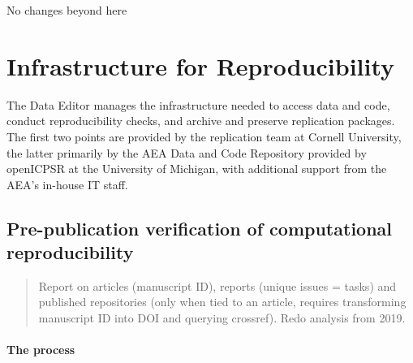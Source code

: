 \documentclass[PP]{AEA}
\newcommand{\aeadcr}{AEA Data and Code Repository}
\begin{document}
\begin{center}
    No changes beyond here
\end{center}

\section{Infrastructure for Reproducibility}
\label{sec:infrastructure}

The Data Editor manages the infrastructure needed to access data and code, conduct reproducibility checks, and archive and preserve replication packages. The first two points are provided by the replication team at Cornell University, the latter primarily by the  \aeadcr{} provided by openICPSR at the University of Michigan, with additional support from the AEA's in-house IT staff. 


\subsection{Pre-publication verification of computational reproducibility}
\label{sec:verification}


\begin{quote}
Report on articles (manuscript ID), reports (unique issues = tasks) and published repositories (only when tied to an article, requires transforming manuscript ID into DOI and querying crossref). Redo analysis from 2019.

\end{quote}

\paragraph{The process}
\end{document}
